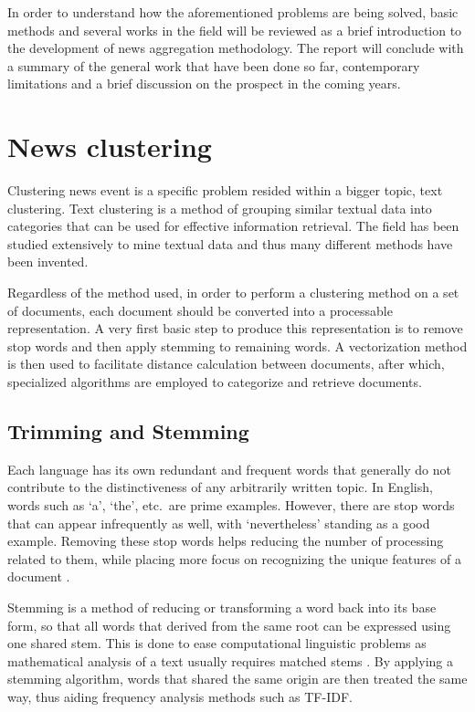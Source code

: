 \documentclass[english]{tktltiki}
\begin{document}
In order to understand how the aforementioned problems are being solved, basic methods and several works in the field will be reviewed as a brief introduction to the development of news aggregation methodology. The report will conclude with a summary of the general work that have been done so far, contemporary limitations and a brief discussion on the prospect in the coming years.

\pagebreak


\section{News clustering}

Clustering news event is a specific problem resided within a bigger topic, text clustering. Text clustering is a method of grouping similar textual data into categories that can be used for effective information retrieval. The field has been studied extensively to mine textual data and thus many different methods have been invented. 

Regardless of the method used, in order to perform a clustering method on a set of documents, each document should be converted into a processable representation. A very first basic step to produce this representation is to remove stop words and then apply stemming to remaining words. A vectorization method is then used to facilitate distance calculation between documents, after which, specialized algorithms are employed to categorize and retrieve documents.

\subsection{Trimming and Stemming}

Each language has its own redundant and frequent words that generally do not contribute to the distinctiveness of any arbitrarily written topic. In English, words such as `a', `the', etc.\ are prime examples. However, there are stop words that can appear infrequently as well, with `nevertheless' standing as a good example. Removing these stop words helps reducing the number of processing related to them, while placing more focus on recognizing the unique features of a document  \cite[p.~8]{rajaraman_ullman_2011}.

Stemming is a method of reducing or transforming a word back into its base form, so that all words that derived from the same root can be expressed using one shared stem. This is done to ease computational linguistic problems as mathematical analysis of a text usually requires matched stems \cite[p.~22]{lovins1968development}. By applying a stemming algorithm, words that shared the same origin are then treated the same way, thus aiding frequency analysis methods such as TF-IDF.
\end{document}
